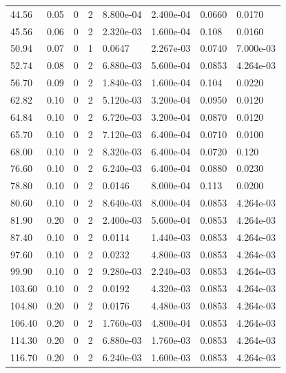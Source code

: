 \documentclass[preview]{standalone}
\begin{document}
{{\begin{tabular}{L{1.2cm}C{1.2cm} C{0.3cm}C{0.5cm} C{1.4cm}C{1.4cm} C{1.4cm}C{1.4cm}}
  44.56  &  0.05  & 0     &  2 &  8.800e-04  & 2.400e-04  & 0.0660 &  0.0170   \\ 
  45.56  &  0.06  & 0     &  2 &  2.320e-03  & 1.600e-04  & 0.108 &  0.0160   \\ 
  50.94  &  0.07  & 0     &  1 &  0.0647  & 2.267e-03  & 0.0740 &  7.000e-03   \\ 
  52.74  &  0.08  & 0     &  2 &  6.880e-03  & 5.600e-04  & 0.0853 &  4.264e-03   \\ 
  56.70  &  0.09  & 0     &  2 &  1.840e-03  & 1.600e-04  & 0.104 &  0.0220   \\ 
  62.82  &  0.10  & 0     &  2 &  5.120e-03  & 3.200e-04  & 0.0950 &  0.0120   \\ 
  64.84  &  0.10  & 0     &  2 &  6.720e-03  & 3.200e-04  & 0.0870 &  0.0120   \\ 
  65.70  &  0.10  & 0     &  2 &  7.120e-03  & 6.400e-04  & 0.0710 &  0.0100   \\ 
  68.00  &  0.10  & 0     &  2 &  8.320e-03  & 6.400e-04  & 0.0720 &  0.120   \\ 
  76.60  &  0.10  & 0     &  2 &  6.240e-03  & 6.400e-04  & 0.0880 &  0.0230   \\ 
  78.80  &  0.10  & 0     &  2 &  0.0146  & 8.000e-04  & 0.113 &  0.0200   \\ 
  80.60  &  0.10  & 0     &  2 &  8.640e-03  & 8.000e-04  & 0.0853 &  4.264e-03   \\ 
  81.90  &  0.20  & 0     &  2 &  2.400e-03  & 5.600e-04  & 0.0853 &  4.264e-03   \\ 
  87.40  &  0.10  & 0     &  2 &  0.0114  & 1.440e-03  & 0.0853 &  4.264e-03   \\ 
  97.60  &  0.10  & 0     &  2 &  0.0232  & 4.800e-03  & 0.0853 &  4.264e-03   \\ 
  99.90  &  0.10  & 0     &  2 &  9.280e-03  & 2.240e-03  & 0.0853 &  4.264e-03   \\ 
  103.60  &  0.10  & 0     &  2 &  0.0192  & 4.320e-03  & 0.0853 &  4.264e-03   \\ 
  104.80  &  0.20  & 0     &  2 &  0.0176  & 4.480e-03  & 0.0853 &  4.264e-03   \\ 
  106.40  &  0.20  & 0     &  2 &  1.760e-03  & 4.800e-04  & 0.0853 &  4.264e-03   \\ 
  114.30  &  0.20  & 0     &  2 &  6.880e-03  & 1.760e-03  & 0.0853 &  4.264e-03   \\ 
  116.70  &  0.20  & 0     &  2 &  6.240e-03  & 1.600e-03  & 0.0853 &  4.264e-03   \\ 

\end{tabular}}}
\end{document}
